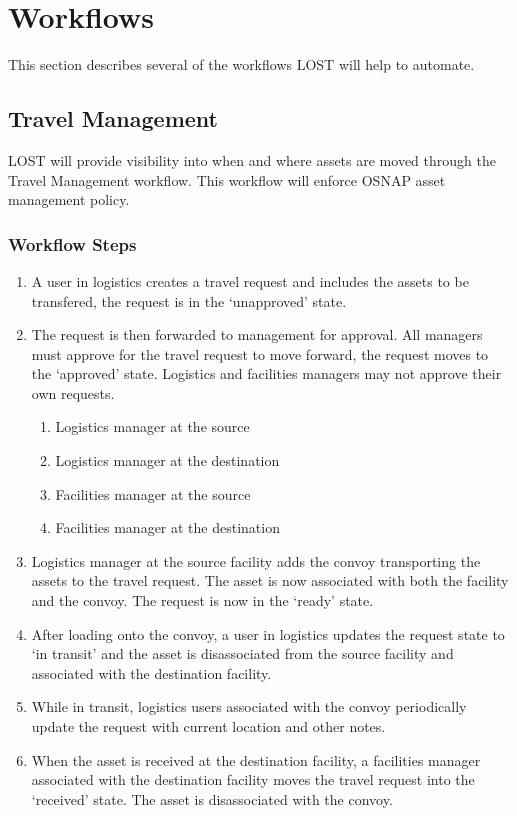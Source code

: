 \chapter*{Workflows}
This section describes several of the workflows LOST will help to automate.

\section*{Travel Management}
LOST will provide visibility into when and where assets are moved through the Travel Management workflow. This workflow will enforce OSNAP asset management policy.
\subsection*{Workflow Steps}
\begin{enumerate}
\item A user in logistics creates a travel request and includes the assets to be transfered, the request is in the `unapproved' state.
\item The request is then forwarded to management for approval. All managers must approve for the travel request to move forward, the request moves to the `approved' state. Logistics and facilities managers may not approve their own requests.
    \begin{enumerate}
    \item Logistics manager at the source
    \item Logistics manager at the destination
    \item Facilities manager at the source
    \item Facilities manager at the destination
    \end{enumerate}
\item Logistics manager at the source facility adds the convoy transporting the assets to the travel request. The asset is now associated with both the facility and the convoy. The request is now in the `ready' state.
\item After loading onto the convoy, a user in logistics updates the request state to `in transit' and the asset is disassociated from the source facility and associated with the destination facility.
\item While in transit, logistics users associated with the convoy periodically update the request with current location and other notes.
\item When the asset is received at the destination facility, a facilities manager associated with the destination facility moves the travel request into the `received' state. The asset is disassociated with the convoy.
\end{enumerate}


